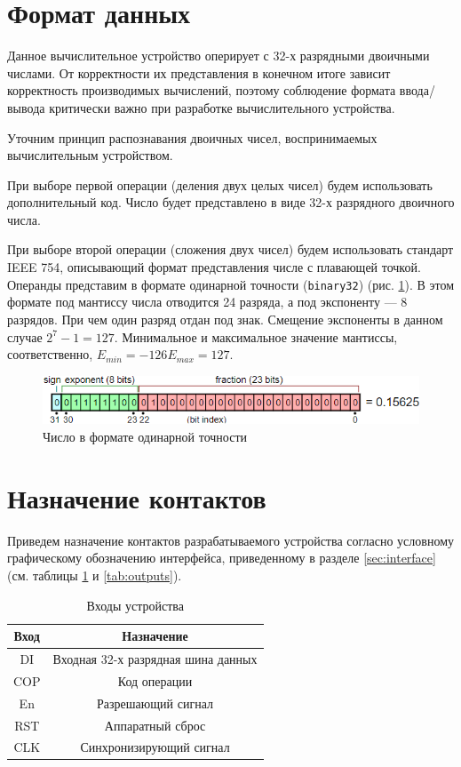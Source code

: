 \documentclass[a4paper,14pt]{extarticle}
\begin{document}
\section{Формат данных}
 Данное вычислительное устройство оперирует с 32-х разрядными двоичными числами. От корректности их представления в конечном итоге зависит корректность производимых вычислений, поэтому соблюдение формата ввода/вывода критически важно при разработке вычислительного устройства. 
 
 Уточним принцип распознавания двоичных чисел, воспринимаемых вычислительным устройством.
 
 При выборе первой операции (деления двух целых чисел) будем использовать дополнительный код. Число будет представлено в виде 32-х разрядного двоичного числа.
 
 При выборе второй операции (сложения двух чисел) будем использовать стандарт IEEE 754, описывающий формат представления числе с плавающей точкой. Операнды представим в формате одинарной точности (\texttt{binary32}) (рис. \ref{fig:coursebinary32}). В этом формате под мантиссу числа отводится 24 разряда, а под экспоненту --- 8 разрядов. При чем один разряд отдан под знак. Смещение экспоненты в данном случае $2^7-1=127$. Минимальное и максимальное значение мантиссы, соответственно, $E_{min}=-126 E_{max}=127$.
 \begin{figure}
 	\centering
 	\includegraphics[width=0.7\linewidth]{images/course_binary32}
 	\caption{Число в формате одинарной точности}
 	\label{fig:coursebinary32}
 \end{figure}
 
 
\section{Назначение контактов}
Приведем назначение контактов разрабатываемого устройства согласно условному графическому обозначению интерфейса, приведенному в разделе \ref{sec:interface} (см. таблицы \ref{tab:inputs} и \ref{tab:outputs}).
\begin{table}[h!]
	\centering
	\begin{tabular}{|c|c|}
		\hline
		\multicolumn{1}{|c|}{\textbf{Вход}} & \multicolumn{1}{c|}{\textbf{Назначение}} \\ \hline
		DI & Входная 32-х разрядная шина данных \\ \hline
		COP & Код операции \\ \hline
		En & Разрешающий сигнал \\ \hline
		RST & Аппаратный сброс \\ \hline
		CLK & Синхронизирующий сигнал \\ \hline
	\end{tabular}
	\caption{Входы устройства}
	\label{tab:inputs}

\end{table}
\end{document}
